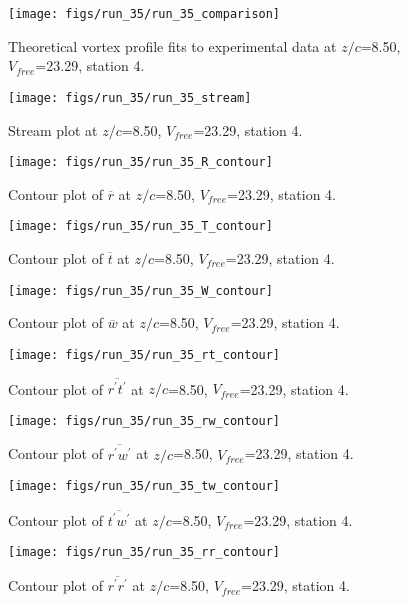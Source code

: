 \begin{figure}[H]
\centering
\texttt{[image: figs/run\_35/run\_35\_comparison]}
\caption{Theoretical vortex profile fits to experimental data at $z/c$=8.50, $V_{free}$=23.29, station 4.}
\end{figure}


\begin{figure}[H]
\centering
\texttt{[image: figs/run\_35/run\_35\_stream]}
\caption{Stream plot at $z/c$=8.50, $V_{free}$=23.29, station 4.}
\end{figure}


\begin{figure}[H]
\centering
\texttt{[image: figs/run\_35/run\_35\_R\_contour]}
\caption{Contour plot of $\overline{r}$ at $z/c$=8.50, $V_{free}$=23.29, station 4.}
\end{figure}


\begin{figure}[H]
\centering
\texttt{[image: figs/run\_35/run\_35\_T\_contour]}
\caption{Contour plot of $\overline{t}$ at $z/c$=8.50, $V_{free}$=23.29, station 4.}
\end{figure}


\begin{figure}[H]
\centering
\texttt{[image: figs/run\_35/run\_35\_W\_contour]}
\caption{Contour plot of $\overline{w}$ at $z/c$=8.50, $V_{free}$=23.29, station 4.}
\end{figure}


\begin{figure}[H]
\centering
\texttt{[image: figs/run\_35/run\_35\_rt\_contour]}
\caption{Contour plot of $\overline{r^\prime t^\prime}$ at $z/c$=8.50, $V_{free}$=23.29, station 4.}
\end{figure}


\begin{figure}[H]
\centering
\texttt{[image: figs/run\_35/run\_35\_rw\_contour]}
\caption{Contour plot of $\overline{r^\prime w^\prime}$ at $z/c$=8.50, $V_{free}$=23.29, station 4.}
\end{figure}


\begin{figure}[H]
\centering
\texttt{[image: figs/run\_35/run\_35\_tw\_contour]}
\caption{Contour plot of $\overline{t^\prime w^\prime}$ at $z/c$=8.50, $V_{free}$=23.29, station 4.}
\end{figure}


\begin{figure}[H]
\centering
\texttt{[image: figs/run\_35/run\_35\_rr\_contour]}
\caption{Contour plot of $\overline{r^\prime r^\prime}$ at $z/c$=8.50, $V_{free}$=23.29, station 4.}
\end{figure}



